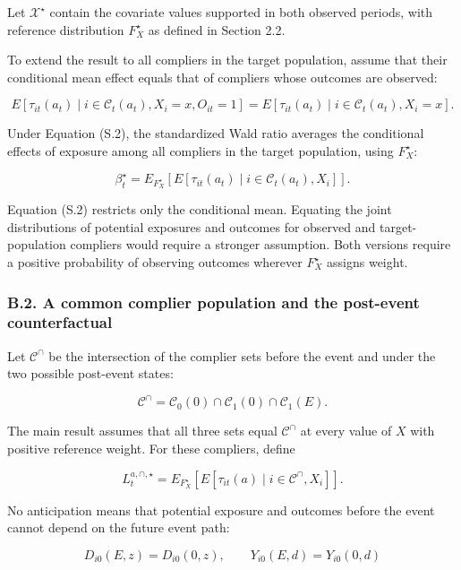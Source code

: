 \documentclass[
  11pt,
]{article}
\begin{document}
Let \(\mathcal X^\star\) contain the covariate values supported in both
observed periods, with reference distribution \(F_X^\star\) as defined
in Section 2.2.

To extend the result to all compliers in the target population, assume
that their conditional mean effect equals that of compliers whose
outcomes are observed:

\[
E[\tau_{it}(a_t)\mid i\in\mathcal C_t(a_t),X_i=x,O_{it}=1]
=E[\tau_{it}(a_t)\mid i\in\mathcal C_t(a_t),X_i=x].
\tag{S.2}
\]

Under Equation (S.2), the standardized Wald ratio averages the
conditional effects of exposure among all compliers in the target
population, using \(F_X^\star\):

\[
\beta_t^\star
=E_{F_X^\star}\!\left[
E[\tau_{it}(a_t)\mid i\in\mathcal C_t(a_t),X_i]
\right].
\tag{S.3}
\]

Equation (S.2) restricts only the conditional mean. Equating the joint
distributions of potential exposures and outcomes for observed and
target-population compliers would require a stronger assumption. Both
versions require a positive probability of observing outcomes wherever
\(F_X^\star\) assigns weight.

\hypertarget{b.2.-a-common-complier-population-and-the-post-event-counterfactual}{%
\subsubsection{B.2. A common complier population and the post-event
counterfactual}\label{b.2.-a-common-complier-population-and-the-post-event-counterfactual}}

Let \(\mathcal C^\cap\) be the intersection of the complier sets before
the event and under the two possible post-event states:

\[
\mathcal C^\cap
=\mathcal C_0(0)\cap\mathcal C_1(0)\cap\mathcal C_1(E).
\tag{S.4}
\]

The main result assumes that all three sets equal \(\mathcal C^\cap\) at
every value of \(X\) with positive reference weight. For these
compliers, define

\[
L_t^{a,\cap,\star}
=E_{F_X^\star}\!\left[
E[\tau_{it}(a)\mid i\in\mathcal C^\cap,X_i]
\right].
\tag{S.5}
\]

No anticipation means that potential exposure and outcomes before the
event cannot depend on the future event path:

\[
D_{i0}(E,z)=D_{i0}(0,z),
\qquad
Y_{i0}(E,d)=Y_{i0}(0,d)
\]
\end{document}
